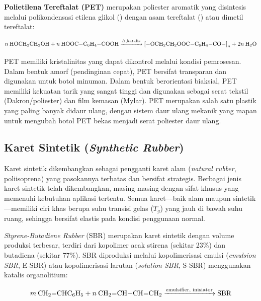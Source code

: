 \documentclass[12pt,a4paper,openany]{book}
\begin{document}
\textbf{Polietilena Tereftalat (PET)} merupakan poliester aromatik yang disintesis melalui polikondensasi etilena glikol () dengan asam tereftalat () atau dimetil tereftalat:

\begin{equation}
n\:\ce{HOCH2CH2OH} + n\:\ce{HOOC-C6H4-COOH} \xrightarrow{\Delta, \text{katalis}} \ce{[-OCH2CH2OOC-C6H4-CO-]}_n + 2n\:\ce{H2O}
\end{equation}

PET memiliki kristalinitas yang dapat dikontrol melalui kondisi pemrosesan. Dalam bentuk amorf (pendinginan cepat), PET bersifat transparan dan digunakan untuk botol minuman. Dalam bentuk berorientasi biaksial, PET memiliki kekuatan tarik yang sangat tinggi dan digunakan sebagai serat tekstil (Dakron/poliester) dan film kemasan (Mylar). PET merupakan salah satu plastik yang paling banyak didaur ulang, dengan sistem daur ulang mekanik yang mapan untuk mengubah botol PET bekas menjadi serat poliester daur ulang.

\subsection{Karet Sintetik (\textit{Synthetic Rubber})}
\label{subsec:karet-sintetik}

Karet sintetik dikembangkan sebagai pengganti karet alam (\textit{natural rubber}, poliisoprena) yang pasokannya terbatas dan bersifat strategis. Berbagai jenis karet sintetik telah dikembangkan, masing-masing dengan sifat khusus yang memenuhi kebutuhan aplikasi tertentu. Semua karet---baik alam maupun sintetik---memiliki ciri khas berupa suhu transisi gelas ($T_g$) yang jauh di bawah suhu ruang, sehingga bersifat elastis pada kondisi penggunaan normal.

\textit{Styrene-Butadiene Rubber} (SBR) merupakan karet sintetik dengan volume produksi terbesar, terdiri dari kopolimer acak stirena (sekitar 23\%) dan butadiena (sekitar 77\%). SBR diproduksi melalui kopolimerisasi emulsi (\textit{emulsion SBR}, E-SBR) atau kopolimerisasi larutan (\textit{solution SBR}, S-SBR) menggunakan katalis organolitium:

\begin{equation}
m\:\ce{CH2=CHC6H5} + n\:\ce{CH2=CH-CH=CH2} \xrightarrow{\text{emulsifier, inisiator}} \text{SBR}
\end{equation}
\end{document}
